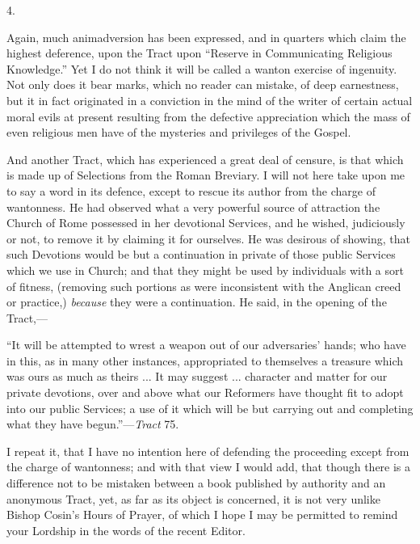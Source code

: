 4.

Again, much animadversion has been expressed, and
in quarters which claim the highest deference, upon the Tract upon ``Reserve
in Communicating Religious Knowledge.'' Yet I do not think it will be
called a wanton exercise of ingenuity. Not only does it bear marks,
which no reader can mistake, of deep earnestness, but it in fact
originated in a conviction in the mind of the writer of certain actual
moral evils at present resulting from the defective appreciation which
the mass of even religious men have of the mysteries and privileges of
the Gospel.

And another Tract, which has experienced a great
deal of censure, is that which is made up of Selections from the Roman
Breviary. I will not here take upon me to say a word in its defence,
except to rescue its author from the charge of wantonness. He had
observed what a very powerful source of attraction the Church of Rome
possessed in her devotional Services, and he wished, judiciously or
not, to remove it by claiming it for ourselves. He was desirous of
showing, that such Devotions would be but a continuation in
private of those public Services which we use in Church; and that they
might be used by individuals with a sort of fitness, (removing such
portions as were inconsistent with the Anglican creed or practice,) \emph{because}
they were a continuation. He said, in the opening of the Tract,—

``It
will be attempted to wrest a weapon out of our adversaries' hands; who
have in this, as in many other instances, appropriated to themselves a
treasure which was ours as much as theirs ... It may suggest ...
character and matter for our private devotions, over and above what
our Reformers have thought fit to adopt into our public Services; a
use of it which will be but carrying out and completing what they have
begun.''—\emph{Tract} 75.

I repeat it, that I have no intention here of
defending the proceeding except from the charge of wantonness; and
with that view I would add, that though there is a difference not to
be mistaken between a book published by authority and an anonymous
Tract, yet, as far as its object is concerned, it is not very unlike
Bishop Cosin's Hours of Prayer, of which I hope I may be permitted to
remind your Lordship in the words of the recent Editor.

